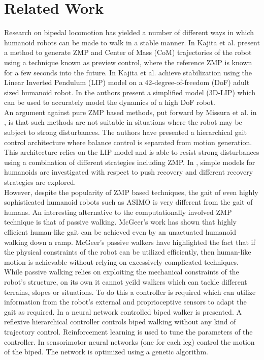 \documentclass[12pt,twoside]{article}
\theoremstyle{plain}
\theoremstyle{definition}
\theoremstyle{remark}
\newcommand{\forceindent}{\leavevmode{\parindent=2em\indent}}
\begin{document}
\section{Related Work}
\label{sec:Related_Work}
Research on bipedal locomotion has yielded a number of different ways in which humanoid robots can be made to walk in a stable manner. In \cite{kajita2003biped} Kajita et al. present a method to generate ZMP and Center of Mass (CoM) trajectories of the robot using a technique known as preview control, where the reference ZMP is known for a few seconds into the future. In \cite{kajita2010biped} Kajita et al. achieve stabilization using the Linear Inverted Pendulum (LIP) model on a 42-degree-of-freedom (DoF) adult sized humanoid robot. In \cite{kajita20013d} the authors present a simplified model (3D-LIP) which can be used to accurately model the dynamics of a high DoF robot.\\
\forceindent An argument against pure ZMP based methods, put forward by Missura et al. in \cite{missura2013omnidirectional, missura2014online, missura2015gradient}, is that such methods are not suitable in situations where the robot may be subject to strong disturbances. The authors have presented a hierarchical gait control architecture where balance control is separated from motion generation. This architecture relies on the LIP model and is able to resist strong disturbances using a combination of different strategies including ZMP. In \cite{stephens2007humanoid}, simple models for humanoids are investigated with respect to push recovery and different recovery strategies are explored.\\
\forceindent However, despite the popularity of ZMP based techniques, the gait of even highly sophisticated humanoid robots such as ASIMO is very different from the gait of humans. An interesting alternative to the computationally involved ZMP technique is that of passive walking. McGeer's work \cite{mcgeer1990passive} has shown that highly efficient human-like gait can be achieved even by an unactuated humanoid walking down a ramp. McGeer's passive walkers have highlighted the fact that if the physical constraints of the robot can be utilized efficiently, then human-like motion is achievable without relying on excessively complicated techniques.\\
\forceindent While passive walking relies on exploiting the mechanical constraints of the robot's structure, on its own it cannot yeild walkers which can tackle different terrains, slopes or situations. To do this a controller is required which can utilize information from the robot's external and proprioceptive sensors to adapt the gait as required. In \cite{geng2005fast} a neural network controlled biped walker is presented. A reflexive hierarchical controller controls biped walking without any kind of trajectory control. Reinforcement learning is used to tune the parameters of the controller. In \cite{paul2005sensorimotor} sensorimotor neural networks (one for each leg) control the motion of the biped. The network is optimized using a genetic algorithm.\\
\end{document}
